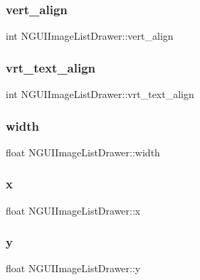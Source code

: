 \hypertarget{class_n_g_u_i_image_list_drawer_a8c547b9f580c759f7a810e0e66ccdfb9}{}\label{class_n_g_u_i_image_list_drawer_a8c547b9f580c759f7a810e0e66ccdfb9} 
\subsubsection{\texorpdfstring{vert\+\_\+align}{vert\_align}}
{\footnotesize\ttfamily int N\+G\+U\+I\+Image\+List\+Drawer\+::vert\+\_\+align}

\hypertarget{class_n_g_u_i_image_list_drawer_a090d06eda5e06073eb3243e1dd8ee8c3}{}\label{class_n_g_u_i_image_list_drawer_a090d06eda5e06073eb3243e1dd8ee8c3} 
\subsubsection{\texorpdfstring{vrt\+\_\+text\+\_\+align}{vrt\_text\_align}}
{\footnotesize\ttfamily int N\+G\+U\+I\+Image\+List\+Drawer\+::vrt\+\_\+text\+\_\+align}

\hypertarget{class_n_g_u_i_image_list_drawer_a60651ec75b4ef756c963bb41b2e6a0ff}{}\label{class_n_g_u_i_image_list_drawer_a60651ec75b4ef756c963bb41b2e6a0ff} 
\subsubsection{\texorpdfstring{width}{width}}
{\footnotesize\ttfamily float N\+G\+U\+I\+Image\+List\+Drawer\+::width}

\hypertarget{class_n_g_u_i_image_list_drawer_ad2f7eec73b1abc42b6110412323cae42}{}\label{class_n_g_u_i_image_list_drawer_ad2f7eec73b1abc42b6110412323cae42} 
\subsubsection{\texorpdfstring{x}{x}}
{\footnotesize\ttfamily float N\+G\+U\+I\+Image\+List\+Drawer\+::x}

\hypertarget{class_n_g_u_i_image_list_drawer_a041b9ed5f7b0700ae85f3cce73548f46}{}\label{class_n_g_u_i_image_list_drawer_a041b9ed5f7b0700ae85f3cce73548f46} 
\subsubsection{\texorpdfstring{y}{y}}
{\footnotesize\ttfamily float N\+G\+U\+I\+Image\+List\+Drawer\+::y}


